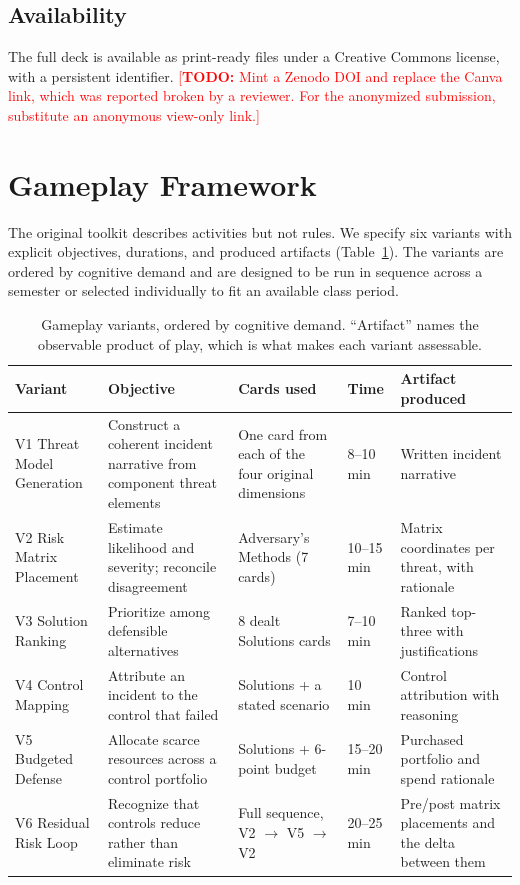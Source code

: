 \documentclass[10pt,twocolumn,letterpaper]{article}
\newcommand{\todo}[1]{\textcolor{red}{[\textbf{TODO:} #1]}}
\begin{document}
\subsection{Availability}

The full deck is available as print-ready files under a Creative Commons
license, with a persistent identifier.
\todo{Mint a Zenodo DOI and replace the Canva link, which was reported broken by
a reviewer. For the anonymized submission, substitute an anonymous
view-only link.}

\section{Gameplay Framework}
\label{sec:gameplay}

The original toolkit describes activities but not rules. We specify six
variants with explicit objectives, durations, and produced artifacts
(Table~\ref{tab:variants}). The variants are ordered by cognitive demand and are
designed to be run in sequence across a semester or selected individually to fit
an available class period.

\begin{table}[t]
\centering
\caption{Gameplay variants, ordered by cognitive demand. ``Artifact'' names the
observable product of play, which is what makes each variant assessable.}
\label{tab:variants}
\small
\begin{tabularx}{\textwidth}{@{}l X l l X@{}}
\toprule
\textbf{Variant} & \textbf{Objective} & \textbf{Cards used} & \textbf{Time} &
\textbf{Artifact produced} \\
\midrule
V1 Threat Model Generation & Construct a coherent incident narrative from
component threat elements & One card from each of the four original dimensions
& 8--10 min & Written incident narrative \\
V2 Risk Matrix Placement & Estimate likelihood and severity; reconcile
disagreement & Adversary's Methods (7 cards) & 10--15 min & Matrix coordinates
per threat, with rationale \\
V3 Solution Ranking & Prioritize among defensible alternatives & 8 dealt
Solutions cards & 7--10 min & Ranked top-three with justifications \\
V4 Control Mapping & Attribute an incident to the control that failed &
Solutions + a stated scenario & 10 min & Control attribution with reasoning \\
V5 Budgeted Defense & Allocate scarce resources across a control portfolio &
Solutions + 6-point budget & 15--20 min & Purchased portfolio and spend
rationale \\
V6 Residual Risk Loop & Recognize that controls reduce rather than eliminate
risk & Full sequence, V2 $\rightarrow$ V5 $\rightarrow$ V2 & 20--25 min &
Pre/post matrix placements and the delta between them \\
\bottomrule
\end{tabularx}
\end{table}
\end{document}
